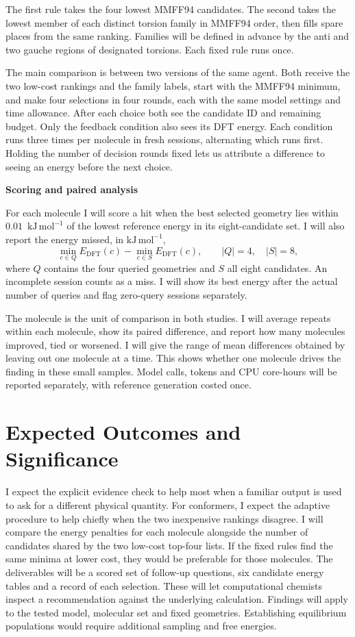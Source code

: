 \documentclass[12pt,a4paper]{article}
\newcommand{\subhead}[1]{\par\addvspace{0.4em}\textbf{#1}\par\nobreak}
\newcommand{\unitE}{\ensuremath{\mathrm{kJ\,mol^{-1}}}}
\begin{document}
The first rule takes the four lowest MMFF94 candidates. The second takes the
lowest member of each distinct torsion family in MMFF94 order, then fills spare
places from the same ranking. Families will be defined in advance by the
anti and two gauche regions of designated torsions. Each fixed rule runs once.

The main comparison is between two versions of the same agent. Both receive
the two low-cost rankings and the family labels, start with the MMFF94 minimum,
and make four selections in four rounds, each with the same model settings
and time allowance. After each choice both see the candidate ID and remaining
budget. Only the feedback condition also sees its DFT energy. Each condition
runs three times per molecule in fresh sessions, alternating which runs first.
Holding the number of decision rounds fixed lets us attribute a difference
to seeing an energy before the next choice.

\subhead{Scoring and paired analysis}
For each molecule I will score a hit when the best selected geometry lies
within $0.01$~\unitE{} of the lowest reference energy in its eight-candidate
set. I will also report the energy missed, in \unitE{},
\[
  \min_{c\in Q} E_{\mathrm{DFT}}(c)-\min_{c\in S} E_{\mathrm{DFT}}(c),
  \qquad |Q|=4,\quad |S|=8,
\]
where $Q$ contains the four queried geometries and $S$ all eight candidates.
An incomplete session counts as a miss. I will show its best energy after
the actual number of queries and flag zero-query sessions separately.

The molecule is the unit of comparison in both studies. I will average repeats
within each molecule, show its paired difference, and report how many molecules
improved, tied or worsened. I will give the range of mean differences obtained
by leaving out one molecule at a time. This shows whether one molecule drives
the finding in these small samples. Model calls, tokens and CPU core-hours
will be reported separately, with reference generation costed once.

\clearpage
\section{Expected Outcomes and Significance}
I expect the explicit evidence check to help most when a familiar output is
used to ask for a different physical quantity. For conformers, I expect the
adaptive procedure to help chiefly when the two inexpensive rankings disagree.
I will compare the energy penalties for each molecule alongside the number
of candidates shared by the two low-cost top-four lists.
If the fixed rules find the same minima at lower cost, they would be preferable
for those molecules.
The deliverables will be a scored set of follow-up questions, six candidate
energy tables and a record of each selection. These will let computational
chemists inspect a recommendation against the underlying calculation. Findings
will apply to the tested model, molecular set and fixed geometries. Establishing
equilibrium populations would require additional sampling and free energies.
\end{document}
